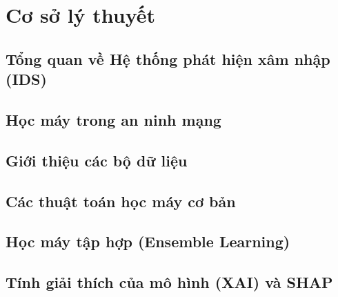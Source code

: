 \chapter{Cơ sở lý thuyết}

\section{Tổng quan về Hệ thống phát hiện xâm nhập (IDS)}

\section{Học máy trong an ninh mạng}

\section{Giới thiệu các bộ dữ liệu}

\section{Các thuật toán học máy cơ bản}

\section{Học máy tập hợp (Ensemble Learning)}

\section{Tính giải thích của mô hình (XAI) và SHAP}
